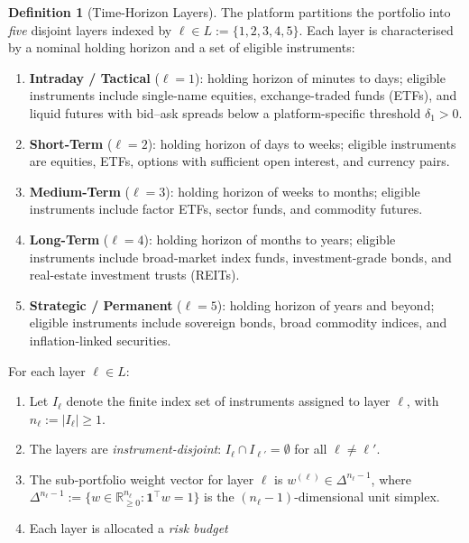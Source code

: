 \documentclass[12pt,openany]{book}
\newcommand{\bfw}{\mathbf{w}}
\numberwithin{equation}{chapter}
\theoremstyle{plain}
\theoremstyle{definition}
\newtheorem{definition}[theorem]{Definition}
\theoremstyle{remark}
\def\mathcal#1{#1}%
\def\bfw{w}%
\begin{document}
\begin{definition}[Time-Horizon Layers]
\label{def:layers}
The platform partitions the portfolio into \emph{five} disjoint
layers indexed by $\ell \in \mathcal{L} := \{1,2,3,4,5\}$.  Each
layer is characterised by a nominal holding horizon and a set of
eligible instruments:
\begin{enumerate}
  \item \textbf{Intraday / Tactical} ($\ell = 1$): holding horizon
        of minutes to days; eligible instruments include single-name
        equities, exchange-traded funds (ETFs), and liquid futures
        with bid--ask spreads below a platform-specific threshold
        $\delta_1 > 0$.
  \item \textbf{Short-Term} ($\ell = 2$): holding horizon of days to
        weeks; eligible instruments are equities, ETFs, options with
        sufficient open interest, and currency pairs.
  \item \textbf{Medium-Term} ($\ell = 3$): holding horizon of weeks
        to months; eligible instruments include factor ETFs,
        sector funds, and commodity futures.
  \item \textbf{Long-Term} ($\ell = 4$): holding horizon of months
        to years; eligible instruments include broad-market index
        funds, investment-grade bonds, and real-estate investment
        trusts (REITs).
  \item \textbf{Strategic / Permanent} ($\ell = 5$): holding horizon
        of years and beyond; eligible instruments include sovereign
        bonds, broad commodity indices, and inflation-linked
        securities.
\end{enumerate}
For each layer $\ell \in \mathcal{L}$:
\begin{enumerate}
  \item Let $\mathcal{I}_\ell$ denote the finite index set of
        instruments assigned to layer $\ell$, with
        $n_\ell := |\mathcal{I}_\ell| \geq 1$.
  \item The layers are \emph{instrument-disjoint}: $\mathcal{I}_\ell
        \cap \mathcal{I}_{\ell'} = \emptyset$ for all
        $\ell \neq \ell'$.
  \item The sub-portfolio weight vector for layer $\ell$ is
        $\bfw^{(\ell)} \in \Delta^{n_\ell - 1}$, where
        $\Delta^{n_\ell - 1} :=
        \{\bfw \in \mathbb{R}^{n_\ell}_{\geq 0} :
        \mathbf{1}^\top \bfw = 1\}$
        is the $(n_\ell{-}1)$-dimensional unit simplex.
  \item Each layer is allocated a \emph{risk budget}

\end{enumerate}
\end{definition}
\end{document}
